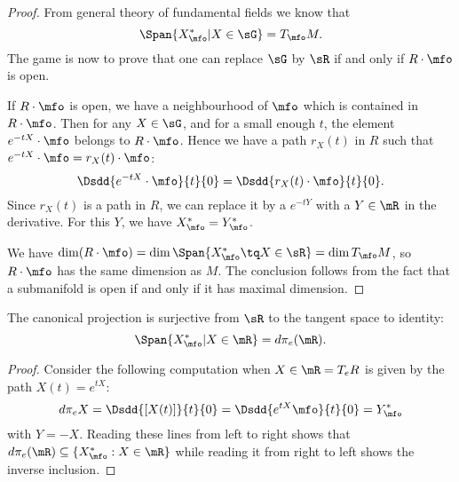 \begin{proof}
From general theory of fundamental fields we know that
\[
\Span\{X^*_{\mfo}|X\in\sG\}=T_{\mfo}M.
\]
The game is now to prove that one can replace $\sG$ by $\sR$ if and only if $R\cdot \mfo$ is open.

If $R\cdot\mfo$ is open, we have a neighbourhood of $\mfo$ which is contained in $R\cdot\mfo$. Then for any $X\in\sG$, and for a small enough $t$, the element $e^{-tX}\cdot\mfo$ belongs to $R\cdot\mfo$. Hence we have a path $r_X(t)$ in $R$ such that $e^{-tX}\cdot\mfo=r_X(t)\cdot\mfo$:
\[
      \Dsdd{e^{-tX}\cdot\mfo}{t}{0}=\Dsdd{r_X(t)\cdot\mfo}{t}{0}.
\]
Since $r_X(t)$ is a path in $R$, we can replace it by a $e^{-tY}$ with a $Y\in\mR$ in the derivative. For this $Y$, we have $X^*_{\mfo}=Y^*_{\mfo}$.

 We have $\dim(R\cdot\mfo)=\dim\Span\{ X^*_{\mfo}\tq X\in\sR \}=\dim T_{\mfo}M$,
so $R\cdot\mfo$ has the same dimension as $M$. The conclusion follows from the fact that a submanifold is open if and only if it has maximal dimension.

\end{proof}

\begin{lemma}
The canonical projection is surjective from $\sR$ to the tangent space to identity:
\begin{equation}\label{eq:equiv_2}
    \Span\{X^*_{\mfo}|X\in\mR\}=d\pi_e(\mR).
\end{equation}

\label{XsdpiR}

\end{lemma}

\begin{proof}
 Consider the following computation when $X\in\mR=T_eR$ is given by the path $X(t)=e^{tX}$:
\begin{equation}
  d\pi_e X=\Dsdd{[X(t)]}{t}{0}
	=\Dsdd{e^{tX}\mfo}{t}{0}
	=Y^*_{\mfo}
\end{equation}
with $Y=-X$. Reading these lines from left to right shows that $d\pi_e(\mR)\subseteq\{X^*_{\mfo}:X\in\mR\}$ while reading it from right to left shows the inverse inclusion.
\end{proof}


